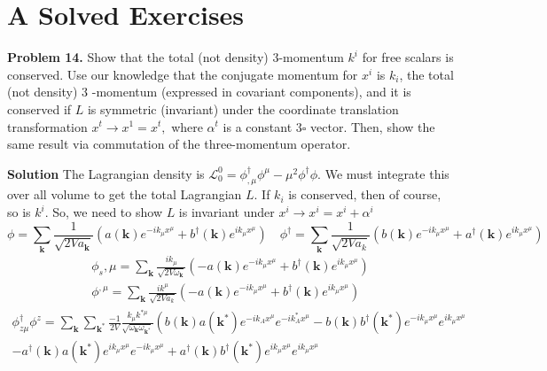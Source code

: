 \section{A Solved Exercises}
\textbf{Problem 14.} Show that the total (not density) 3-momentum $k^{i}$ for free scalars is conserved. Use our knowledge that the conjugate momentum for $x^{i}$ is $k_{i}$, the total (not density) 3 -momentum (expressed in covariant components), and it is conserved if $L$ is symmetric (invariant) under the coordinate translation transformation $x^{t} \rightarrow x^{1}=x^{t},$ where $\alpha^{t}$ is a constant $3 \square$ vector. Then, show the same result via commutation of the three-momentum operator.

\textbf{Solution}
The Lagrangian density is $\mathcal{L}_{0}^{0}=\phi_{, \mu}^{\dagger} \phi^{\mu}-\mu^{2} \phi^{\dagger} \phi .$ We must integrate this over all volume to get the total Lagrangian $L$. If $k_{i}$ is conserved, then of course, so is $k^{i}$. So, we need to show $L$ is invariant under $x^{i} \rightarrow x^{i}=x^{i}+\alpha^{i}$
$$
\phi=\sum_{\mathbf{k}} \frac{1}{\sqrt{2 V a_{\mathbf{k}}}}\left(a(\mathbf{k}) e^{-i k_{\mu} x^{\mu}}+b^{\dagger}(\mathbf{k}) e^{i k_{\mu} x^{\mu}}\right) \quad \phi^{\dagger}=\sum_{\mathbf{k}} \frac{1}{\sqrt{2 V a_{k}}}\left(b(\mathbf{k}) e^{-i k_{\mu} x^{\mu}}+a^{\dagger}(\mathbf{k}) e^{i k_{\mu} x^{\mu}}\right)
$$
$$
\begin{array}{l}
{\phi_{s}, \mu=\sum_{\mathbf{k}} \frac{i k_{\mu}}{\sqrt{2 V \omega_{\mathbf{k}}}}\left(-a(\mathbf{k}) e^{-i k_{\mu} x^{\mu}}+b^{\dagger}(\mathbf{k}) e^{i k_{\mu} x^{\mu}}\right)} \\
{\phi^{, \mu}=\sum_{\mathbf{k}} \frac{i k^{\mu}}{\sqrt{2 V a_{k}}}\left(-a(\mathbf{k}) e^{-i k_{\mu} x^{\mu}}+b^{\dagger}(\mathbf{k}) e^{i k_{\mu} x^{\mu}}\right)}
\end{array}
$$
$$
\begin{aligned}
\phi^{\dagger}_{z \mu} \phi^{z}=\sum_{\mathbf{k}} \sum_{\mathbf{k}^{*}} \frac{-1}{2 V} \frac{k_{\mu} k^{* \mu}}{\sqrt{\omega_{\mathbf{k}} \omega_{\mathbf{k}^{*}}}}\left(b(\mathbf{k}) a\left(\mathbf{k}^{*}\right) e^{-i k_{A} x^{\mu}} e^{-i k_{A}^{*} x^{\mu}}-b(\mathbf{k}) b^{\dagger}\left(\mathbf{k}^{*}\right) e^{-i k_{\mu} x^{\mu}} e^{i k_{\mu} x^{\mu}}\right.\\
-a^{\dagger}(\mathbf{k}) a\left(\mathbf{k}^{*}\right) e^{i k_{\mu} x^{\mu}} e^{-i k_{\mu} x^{\mu}}+a^{\dagger}(\mathbf{k}) b^{\dagger}\left(\mathbf{k}^{*}\right) e^{i k_{\mu} x^{\mu}} e^{i k_{\mu} x^{\mu}}
\end{aligned}
$$
